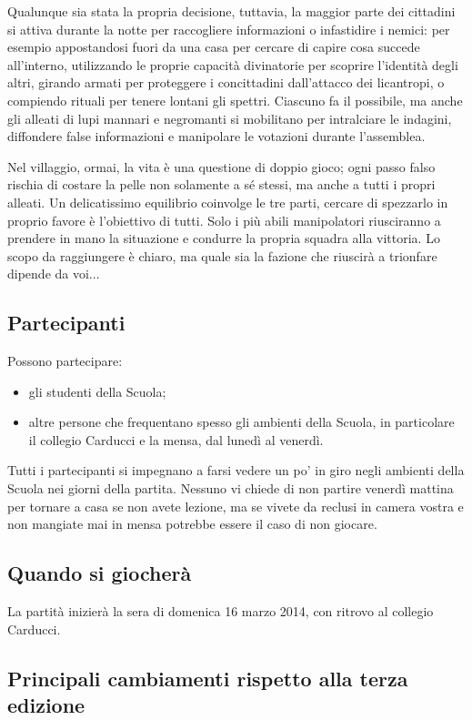 \documentclass[a4paper,10pt]{article}
\begin{document}
Qualunque sia stata la propria decisione, tuttavia, la maggior parte dei
cittadini si attiva durante la notte per raccogliere informazioni o infastidire
i nemici: per esempio appostandosi fuori da una casa per cercare di capire cosa
succede all'interno, utilizzando le proprie capacità divinatorie per scoprire
l'identità degli altri, girando armati per proteggere i concittadini
dall'attacco dei licantropi, o compiendo rituali per tenere lontani gli spettri.
Ciascuno fa il possibile, ma anche gli alleati di lupi mannari e negromanti si
mobilitano per intralciare le indagini, diffondere false informazioni e
manipolare le votazioni durante l'assemblea.

Nel villaggio, ormai, la vita è una questione di doppio gioco; ogni passo falso
rischia di costare la pelle non solamente a sé stessi, ma anche a tutti i propri
alleati. Un delicatissimo equilibrio coinvolge le tre parti, cercare di
spezzarlo in proprio favore è l'obiettivo di tutti. Solo i più abili
manipolatori riusciranno a prendere in mano la situazione e condurre la
propria squadra alla vittoria. Lo scopo da raggiungere è chiaro, ma quale sia la
fazione che riuscirà a trionfare dipende da voi...



\subsection{Partecipanti}
Possono partecipare:
\begin{itemize}
 \item gli studenti della Scuola;
 \item altre persone che frequentano spesso gli ambienti della Scuola, in
particolare il collegio Carducci e la mensa, dal lunedì al venerdì.
\end{itemize}
Tutti i partecipanti si impegnano a farsi vedere un po' in giro negli ambienti
della Scuola nei giorni della partita. Nessuno vi chiede di non partire venerdì
mattina per tornare a casa se non avete lezione, ma se vivete da reclusi in
camera vostra e non mangiate mai in mensa potrebbe essere il caso di non
giocare.


\subsection{Quando si giocherà}

La partità inizierà la sera di domenica 16 marzo 2014, con ritrovo al collegio Carducci.


\subsection{Principali cambiamenti rispetto alla terza edizione}
\end{document}
